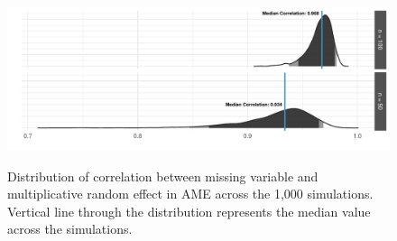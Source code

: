 \begin{figure}
	\centering
	\caption{Distribution of correlation between missing variable and multiplicative random effect in AME across the 1,000 simulations. Vertical line through the distribution represents the median value across the simulations.}
	\label{fig:ameCorr}
	\includegraphics[width=1\textwidth]{ameSimCorr.pdf} \\
\end{figure}